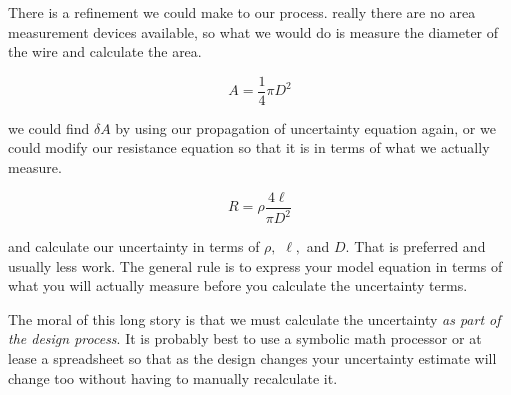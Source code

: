 There is a refinement we could make to our process. really there are no area measurement devices available, so what we would do is measure the diameter of the wire and calculate the area.

\begin{equation*}
	A=\frac{1}{4}\pi D^{2}
\end{equation*}

we could find $\delta A$ by using our propagation of uncertainty equation again, or we could modify our resistance equation so that it is in terms of what we actually measure.

\begin{equation*}
	R=\rho \frac{4\ell }{\pi D^{2}}
\end{equation*}

and calculate our uncertainty in terms of $\rho ,$ $\ell ,$ and $D.$ That is preferred and usually less work. The general rule is to express your model equation in terms of what you will actually measure before you calculate the uncertainty terms.

The moral of this long story is that we must calculate the uncertainty \emph{as part of the design process}. It is probably best to use a symbolic math processor or at lease a spreadsheet so that as the design changes your uncertainty estimate will change too without having to manually recalculate it.


